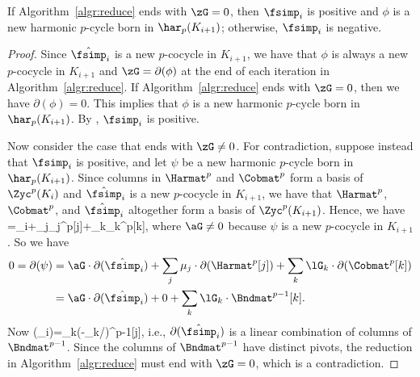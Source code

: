 \begin{proposition}
\label{prop:reduce}
If 
Algorithm~\ref{algr:reduce} ends with $\zG=0$,
then $\fsimp_i$ is positive
and $\phi$ is a new harmonic $p$-cycle born in $\har_p(K_{i+1})$;
otherwise, $\fsimp_i$ is negative.
\end{proposition}
\begin{proof}

Since $\hat{\fsimp}_i$ is a new $p$-cocycle in $K_{i+1}$,
we have that $\phi$ is always a new $p$-cocycle in $K_{i+1}$
and  $\zG=\partial(\phi)$ at the end of each iteration in Algorithm~\ref{algr:reduce}.
If Algorithm~\ref{algr:reduce}
ends with $\zG=0$, then 
we have $\partial(\phi)=0$.
This implies that $\phi$ is a new harmonic $p$-cycle born in $\har_p(K_{i+1})$.
By ,
$\fsimp_i$ is positive.

Now consider the case that  ends with $\zG\neq 0$.
For  contradiction, suppose instead that $\fsimp_i$ is positive,
and let $\psi$ be a new harmonic $p$-cycle born in $\har_p(K_{i+1})$.
Since columns in $\Harmat^p$ and $\Cobmat^p$ form a basis of $\Zyc^p(K_i)$
and $\hat{\fsimp}_i$ is a new $p$-cocycle in $K_{i+1}$,
we have that $\Harmat^p$, $\Cobmat^p$, and $\hat{\fsimp}_i$ altogether form a basis of $\Zyc^p(K_{i+1})$.
Hence, 
we have
\mbeg\psi=\aG\cdot\hat{\fsimp}_i+\sum_j\mu_j\cdot\Harmat^p[j]+\sum_k\lG_k\cdot\Cobmat^p[k],\mend
where $\aG\neq 0$ because 
$\psi$ is a new  $p$-cocycle in $K_{i+1}$.
So we have \begin{align*}
0=\partial(\psi)&=\aG\cdot\partial(\hat{\fsimp}_i)+\sum_j\mu_j\cdot\partial(\Harmat^p[j])+\sum_k\lG_k\cdot\partial(\Cobmat^p[k])\\
&=\aG\cdot\partial(\hat{\fsimp}_i)+0+\sum_k\lG_k\cdot\Bndmat^{p-1}[k].
\end{align*}
Now \mbeg\partial(\hat{\fsimp}_i)=\sum_k(-\lG_k/\aG)\cdot\Bndmat^{p-1}[j],\mend
i.e., $\partial(\hat{\fsimp}_i)$ is a linear combination of
columns of $\Bndmat^{p-1}$.
Since the columns of $\Bndmat^{p-1}$ have distinct pivots,
the reduction in Algorithm~\ref{algr:reduce} must end with $\zG=0$,
which is a contradiction.
\end{proof}

